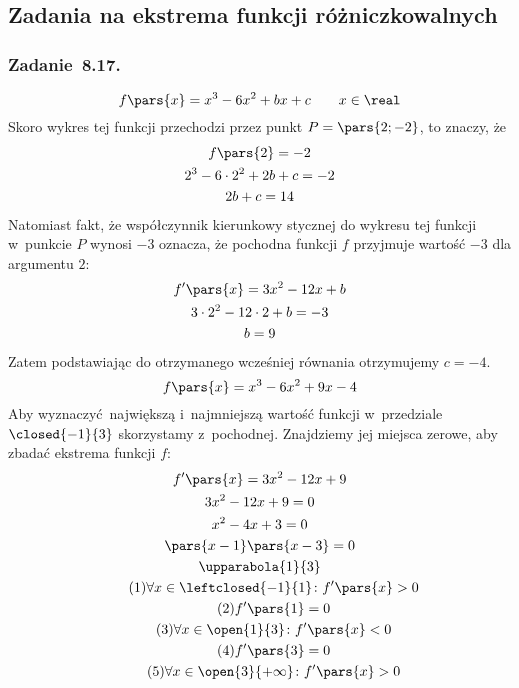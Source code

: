 \subsection*{Zadania na ekstrema funkcji różniczkowalnych}
\subsubsection*{Zadanie~8.17.}
\begin{equation*}
    f\pars{x} = x^3 - 6x^2 + bx + c \qquad x \in \real
\end{equation*}
Skoro wykres tej funkcji przechodzi przez punkt \(P = \pars{2; -2}\), to znaczy, że
\begin{gather*}
    f\pars{2} = -2\\
    2^3 - 6 \cdot 2^2 + 2b + c = -2\\
    2b + c = 14
\end{gather*}
Natomiast fakt, że współczynnik kierunkowy stycznej do wykresu tej funkcji w~punkcie \(P\) wynosi \(-3\) oznacza, że pochodna funkcji \(f\) przyjmuje wartość \(-3\) dla argumentu \(2\):
\begin{gather*}
    f'\pars{x} = 3x^2 - 12x + b\\
    3 \cdot 2^2 - 12 \cdot 2 + b = -3\\
    b = 9
\end{gather*}
Zatem podstawiając do otrzymanego wcześniej równania otrzymujemy \(c = -4\).
\begin{equation*}
    f\pars{x} = x^3 - 6x^2 + 9x - 4
\end{equation*}
Aby wyznaczyć największą i~najmniejszą wartość funkcji w~przedziale \(\closed{-1}{3}\) skorzystamy z~pochodnej. Znajdziemy jej miejsca zerowe, aby zbadać ekstrema funkcji \(f\):
\begin{gather*}
    f'\pars{x} = 3x^2 - 12x + 9\\
    3x^2 - 12x + 9 = 0\\
    x^2 - 4x + 3 = 0\\
    \pars{x - 1}\pars{x - 3} = 0\\
    \upparabola{1}{3}\\
    \tag{\(1\)} \forall x \in \leftclosed{-1}{1}\colon f'\pars{x} > 0 \label{2020_10_23:8_17:first_increase}\\
    \tag{\(2\)} f'\pars{1} = 0 \label{2020_10_23:8_17:first_zero}\\
    \tag{\(3\)} \forall x \in \open{1}{3}\colon f'\pars{x} < 0 \label{2020_10_23:8_17:decrease}\\
    \tag{\(4\)} f'\pars{3} = 0 \label{2020_10_23:8_17:second_zero}\\
    \tag{\(5\)} \forall x \in \open{3}{+\infty}\colon f'\pars{x} > 0 \label{2020_10_23:8_17:second_increase}
\end{gather*}
